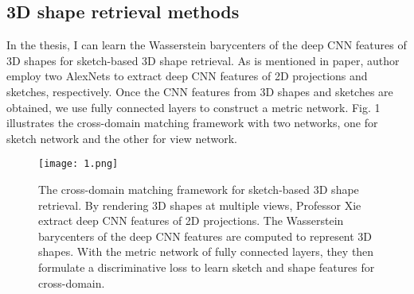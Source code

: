 \documentclass{article}
\begin{document}
\subsection{3D shape retrieval methods}
  In the thesis, I can learn the Wasserstein barycenters of the deep CNN features of 3D shapes for sketch-based 3D shape retrieval. As is mentioned in paper, author employ two AlexNets to extract deep CNN features of 2D projections and sketches, respectively. Once the CNN features from 3D shapes and sketches are obtained, we use fully connected layers to construct a metric network. Fig. 1 illustrates the cross-domain matching framework with two networks, one for sketch network and the other for view network.

\begin{figure}[ht]
\centering
\texttt{[image: 1.png]}
\caption{The cross-domain matching framework for sketch-based 3D shape retrieval. By rendering 3D shapes at multiple views, Professor Xie extract deep CNN features of 2D projections. The Wasserstein barycenters of the deep CNN features are computed to represent 3D shapes. With the metric network of fully connected layers, they then formulate a discriminative loss to learn sketch and shape features for cross-domain.}
\end{figure}


\end{document}
